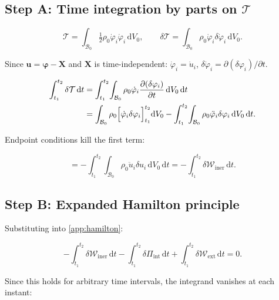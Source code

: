 \documentclass[11pt]{article}
\begin{document}
\subsection{Step A: Time integration by parts on $\mathcal{T}$}

\begin{equation}
\mathcal{T}
= \int_{\mathcal{B}_0}\tfrac{1}{2}\rho_0\dot{\varphi}_i\dot{\varphi}_i\,\mathrm{d}V_0,
\qquad
\delta\mathcal{T}
= \int_{\mathcal{B}_0}\rho_0\dot{\varphi}_i\delta\dot{\varphi}_i\,\mathrm{d}V_0.
\end{equation}

Since $\mathbf{u}=\boldsymbol{\varphi}-\mathbf{X}$ and $\mathbf{X}$ is time-independent: $\dot{\varphi}_i=\dot{u}_i$, $\delta\dot{\varphi}_i=\partial(\delta\varphi_i)/\partial t$.

\begin{align}
\int_{t_1}^{t_2}\delta\mathcal{T}\,\mathrm{d}t
&= \int_{t_1}^{t_2}\!\int_{\mathcal{B}_0}\rho_0\dot{\varphi}_i\frac{\partial(\delta\varphi_i)}{\partial t}\,\mathrm{d}V_0\,\mathrm{d}t \notag\\
&= \int_{\mathcal{B}_0}\rho_0\Bigl[\dot{\varphi}_i\delta\varphi_i\Bigr]_{t_1}^{t_2}\mathrm{d}V_0
   - \int_{t_1}^{t_2}\!\int_{\mathcal{B}_0}\rho_0\ddot{\varphi}_i\delta\varphi_i\,\mathrm{d}V_0\,\mathrm{d}t.
\end{align}

Endpoint conditions kill the first term:

\begin{equation}
= -\int_{t_1}^{t_2}\!\int_{\mathcal{B}_0}\rho_0\ddot{u}_i\delta u_i\,\mathrm{d}V_0\,\mathrm{d}t
= -\int_{t_1}^{t_2}\delta\mathcal{W}_{\mathrm{iner}}\,\mathrm{d}t.
\label{app:timeibp}
\end{equation}

\subsection{Step B: Expanded Hamilton principle}

Substituting into \eqref{app:hamilton}:

\begin{equation}
-\int_{t_1}^{t_2}\delta\mathcal{W}_{\mathrm{iner}}\,\mathrm{d}t
- \int_{t_1}^{t_2}\delta\Pi_{\mathrm{int}}\,\mathrm{d}t
+ \int_{t_1}^{t_2}\delta\mathcal{W}_{\mathrm{ext}}\,\mathrm{d}t
= 0.
\end{equation}

Since this holds for arbitrary time intervals, the integrand vanishes at each instant:
\end{document}
